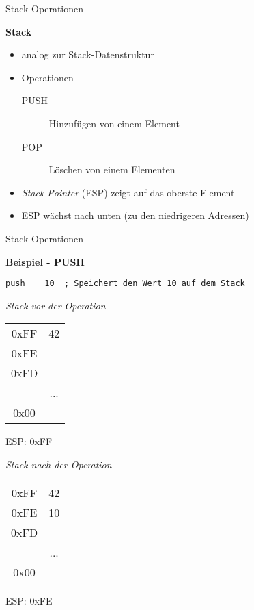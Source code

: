 \begin{frame}{Stack-Operationen}

\begin{center}
\textbf{Stack}
\end{center}

\begin{itemize}
	\item analog zur Stack-Datenstruktur

	\item Operationen
	\begin{description}
		\item [PUSH] Hinzufügen von einem Element
		
		\item [POP] Löschen von einem Elementen
	\end{description}

	\item \textit{Stack Pointer} (ESP) zeigt auf das oberste Element

	\item ESP wächst nach unten (zu den niedrigeren Adressen)
\end{itemize}
\end{frame}


\begin{frame}[fragile]{Stack-Operationen}

\begin{center}
\textbf{Beispiel - PUSH}
\end{center}

\begin{lstlisting}
push    10  ; Speichert den Wert 10 auf dem Stack
\end{lstlisting}

\begin{multicols}{2}
\begin{minipage}{5cm}
\emph{Stack vor der Operation}\\
\begin{tabular}{c|c|}
	\cline{2-2}
   0xFF & 42\\ \cline{2-2}
   0xFE & \\ \cline{2-2}
   0xFD & \\ \cline{2-2}
	      & ... \\ \cline{2-2}
	 0x00 & \\ \cline{2-2}
\end{tabular}
ESP: 0xFF
\end{minipage}

\begin{minipage}{5cm}
\emph{Stack nach der Operation}\\
\begin{tabular}{c|c|}
	\cline{2-2}
   0xFF & 42\\ \cline{2-2}
   0xFE & 10\\ \cline{2-2}
   0xFD & \\ \cline{2-2}
	      & ... \\ \cline{2-2}
	 0x00 & \\ \cline{2-2}
\end{tabular}
ESP: 0xFE
\end{minipage}
\end{multicols}
\end{frame}


